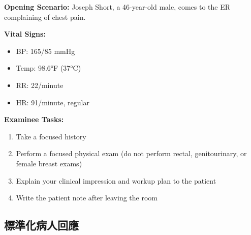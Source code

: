 \documentclass[12pt,a4paper]{article}
\begin{document}
\begin{tcolorbox}[colback=emergency_red!10!white,colframe=emergency_red,title=\textbf{門口資訊（Doorway Information）}]
\textbf{Opening Scenario:} Joseph Short, a 46-year-old male, comes to the ER complaining of chest pain.

\textbf{Vital Signs:}
\begin{itemize}
    \item BP: 165/85 mmHg
    \item Temp: 98.6°F (37°C)
    \item RR: 22/minute
    \item HR: 91/minute, regular
\end{itemize}

\textbf{Examinee Tasks:}
\begin{enumerate}
    \item Take a focused history
    \item Perform a focused physical exam (do not perform rectal, genitourinary, or female breast exams)
    \item Explain your clinical impression and workup plan to the patient
    \item Write the patient note after leaving the room
\end{enumerate}
\end{tcolorbox}

\subsection{標準化病人回應}
\end{document}
